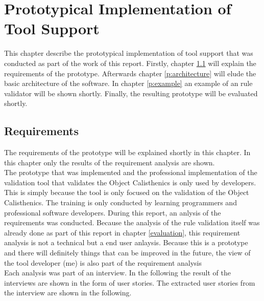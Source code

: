 \chapter{Prototypical Implementation of Tool Support}
\label{Prototype}
This chapter describe the prototypical implementation of tool support that was conducted as part of the work of this report. Firstly, chapter \ref{p:requirements} will explain the requirements of the prototype. Afterwards chapter \ref{p:architecture} will elude the basic architecture of the software. In chapter \ref{p:example} an example of an rule validator will be shown shortly. Finally, the resulting prototype will be evaluated shortly. 

\section{Requirements}
\label{p:requirements}
The requirements of the prototype will be explained shortly in this chapter. In this chapter only the results of the requirement analysis are shown.
\\

The prototype that was implemented and the professional implementation of the validation tool that validates the Object Calisthenics is only used by developers. This is simply because the tool is only focused on the validation of the Object Calisthenics. The training is only conducted by learning programmers and professional software developers. During this report, an anlysis of the requirements was conducted. Because the analysis of the rule validation itself was already done as part of this report in chapter \ref{evaluation}, this requirement analysis is not a technical but a end user anlaysis. Because this is a prototype and there will definitely things that can be improved in the future, the view of the tool developer (me) is also part of the requirement analysis
\\

Each analysis was part of an interview. In the following the result of the interviews are shown in the form of user stories. The extracted user stories from the interview are shown in the following.
\\


